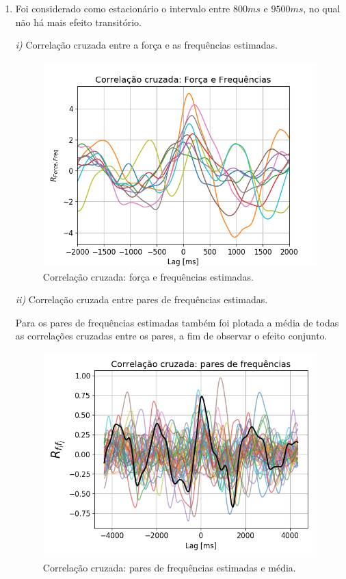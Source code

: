 \documentclass[12pt,letterpaper]{article}
\begin{document}
\begin{enumerate}[label=(\alph*)]
    \item
    Foi considerado como estacionário o intervalo entre ${800ms}$ e ${9500ms}$, no qual não há mais efeito transitório.
    
    {\it i)} Correlação cruzada entre a força e as frequências estimadas.
        
        \begin{figure}[H]
            \centering
            \includegraphics[width=15cm]{TC2/images/corr_force-freqs.png}
            \caption{Correlação cruzada: força e frequências estimadas.}
            \label{fig:3}
        \end{figure}
    
    {\it ii)} Correlação cruzada entre pares de frequências estimadas.
    
    Para os pares de frequências estimadas também foi plotada a média de todas as correlações cruzadas entre os pares, a fim de observar o efeito conjunto. 
        
        \begin{figure}[H]
            \centering
            \includegraphics[width=15cm]{TC2/images/corr-freq-freq.png}
            \caption{Correlação cruzada: pares de frequências estimadas e média.}
            \label{fig:3}
        \end{figure}
    

\end{enumerate}
\end{document}
